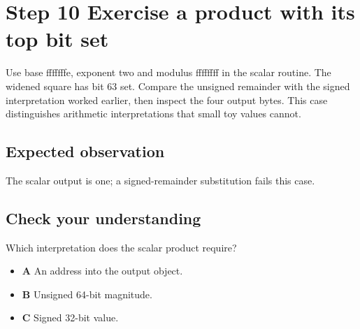 \section{Step 10 Exercise a product with its top bit set}\label{rsa-s10}

Use base fffffffe, exponent two and modulus ffffffff in the scalar routine. The widened square has bit 63 set. Compare the unsigned remainder with the signed interpretation worked earlier, then inspect the four output bytes. This case distinguishes arithmetic interpretations that small toy values cannot.

\subsection{Expected observation}
The scalar output is one; a signed-remainder substitution fails this case.

\subsection{Check your understanding}
Which interpretation does the scalar product require?

\begin{itemize}
  \item \textbf{A} An address into the output object.
  \item \textbf{B} Unsigned 64-bit magnitude.
  \item \textbf{C} Signed 32-bit value.
\end{itemize}
